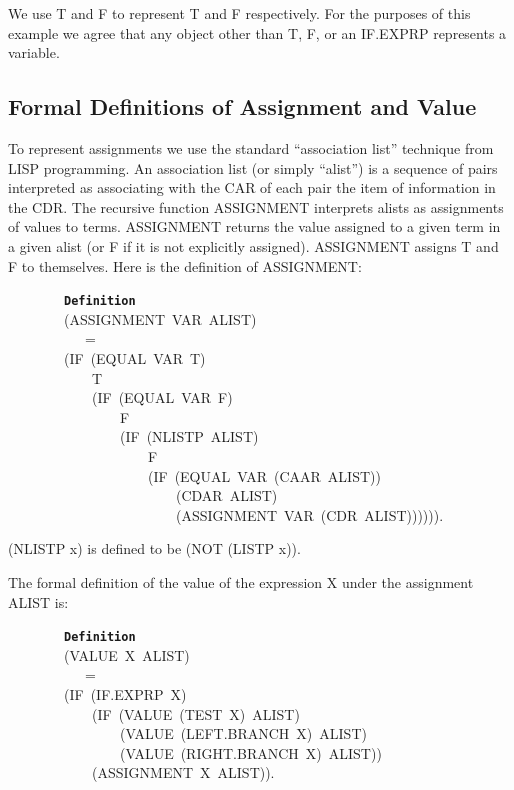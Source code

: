 \documentclass[11pt]{book}
\newenvironment{pubasis}{\begin{flushleft}\ttfamily\small}{\normalsize\rmfamily\end{flushleft}}
\newcommand{\axiomordefinition}[1]{\vspace{6pt}\texttt{\textbf{#1}}}
\newcommand{\pubdefaulttextsize}{\large}
\begin{document}
We  use T and F to represent T and F respectively.
For the purposes of this example
we agree that any object other than T, F, or an
IF.EXPRP  represents a  variable.
\subsection{Formal Definitions of Assignment and Value}
\pubdefaulttextsize
To represent assignments we  use the standard ``association list''
technique from LISP programming.  An association list (or simply ``alist'') is  a sequence of
pairs interpreted as
associating with the CAR of each pair the item of information in the CDR.
The recursive function  ASSIGNMENT interprets
alists as assignments of  values to terms.
ASSIGNMENT returns the  value
assigned to a given term in
a given alist (or F if it is not explicitly assigned).    ASSIGNMENT assigns T and F to themselves.
Here is the definition of ASSIGNMENT:
\begin{pubasis}
~~~~~~~~\axiomordefinition{Definition}\\
~~~~~~~~(ASSIGNMENT~VAR~ALIST)\\
~~~~~~~~~~~=\\
~~~~~~~~(IF~(EQUAL~VAR~T)\\
~~~~~~~~~~~~T\\
~~~~~~~~~~~~(IF~(EQUAL~VAR~F)\\
~~~~~~~~~~~~~~~~F\\
~~~~~~~~~~~~~~~~(IF~(NLISTP~ALIST)\\
~~~~~~~~~~~~~~~~~~~~F\\
~~~~~~~~~~~~~~~~~~~~(IF~(EQUAL~VAR~(CAAR~ALIST))\\
~~~~~~~~~~~~~~~~~~~~~~~~(CDAR~ALIST)\\
~~~~~~~~~~~~~~~~~~~~~~~~(ASSIGNMENT~VAR~(CDR~ALIST)))))).\\
\end{pubasis}
(NLISTP x) is defined to be (NOT (LISTP x)).

The formal definition of the value of the expression X under the
assignment ALIST is:
\begin{pubasis}
~~~~~~~~\axiomordefinition{Definition}\\
~~~~~~~~(VALUE~X~ALIST)\\
~~~~~~~~~~~=\\
~~~~~~~~(IF~(IF.EXPRP~X)\\
~~~~~~~~~~~~(IF~(VALUE~(TEST~X)~ALIST)\\
~~~~~~~~~~~~~~~~(VALUE~(LEFT.BRANCH~X)~ALIST)\\
~~~~~~~~~~~~~~~~(VALUE~(RIGHT.BRANCH~X)~ALIST))\\
~~~~~~~~~~~~(ASSIGNMENT~X~ALIST)).\\
\end{pubasis}
\end{document}
